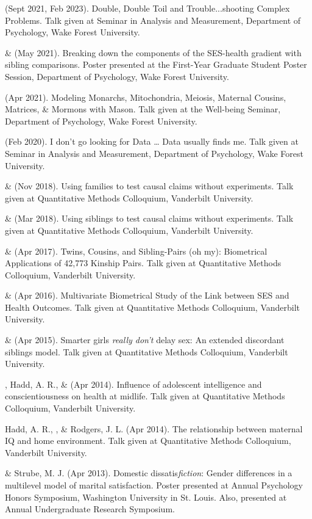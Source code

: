 \begin{etaremune}
\item \meb (Sept 2021, Feb 2023). Double, Double Toil and Trouble...shooting Complex Problems. Talk given at Seminar in Analysis and Measurement, Department of Psychology, Wake Forest University. 
%
\item \yrh \& \meb (May 2021). Breaking down the components of the SES-health gradient with sibling comparisons. Poster presented at the First-Year Graduate Student Poster Session, Department of Psychology, Wake Forest University.
%
\item\meb (Apr 2021). Modeling Monarchs, Mitochondria, Meiosis, Maternal Cousins, Matrices, \& Mormons with Mason. Talk given at the Well-being Seminar, Department of Psychology, Wake Forest University. 
%
\item\meb (Feb 2020). I don't go looking for Data … Data usually finds me. Talk given at Seminar in Analysis and Measurement, Department of Psychology, Wake Forest University. 
%
\item\meb \& \Joe (Nov 2018). Using families to test causal claims without experiments. Talk given at Quantitative Methods Colloquium, Vanderbilt University. 
%
\item\meb \& \Joe (Mar 2018). Using siblings to test causal claims without experiments. Talk given at Quantitative Methods Colloquium, Vanderbilt University.
%
\item\meb \& \Joe (Apr 2017). Twins, Cousins, and Sibling-Pairs (oh my): Biometrical Applications of 42,773 Kinship Pairs. Talk given at Quantitative Methods Colloquium, Vanderbilt University. %
%
\item\meb \& \Joe (Apr 2016). Multivariate Biometrical Study of the Link between SES and Health Outcomes. Talk given at Quantitative Methods Colloquium, Vanderbilt University.
%
\item\meb \& \Joe (Apr 2015). Smarter girls \textit{really don't} delay sex: An extended discordant siblings model. Talk given at Quantitative Methods Colloquium, Vanderbilt University.
\item\meb, Hadd, A. R., \& \Joe (Apr 2014). Influence of adolescent intelligence and conscientiousness on health at midlife. Talk given at Quantitative Methods Colloquium, Vanderbilt University. 
%
\item Hadd, A. R., \meb, \& Rodgers, J. L. (Apr 2014). The relationship between maternal IQ and home environment. Talk given at Quantitative Methods Colloquium, Vanderbilt University.
%
\item\meb \& Strube, M. J. (Apr 2013). Domestic dissatis{\em fiction}: Gender differences in a multilevel model of marital satisfaction. Poster presented at Annual Psychology Honors Symposium, Washington University in St. Louis. Also, presented at Annual Undergraduate Research Symposium.
\end{etaremune}
